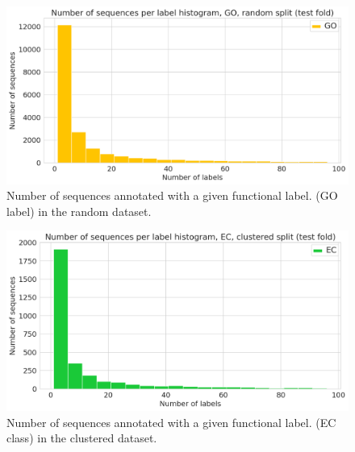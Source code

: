 \begin{figure}[htbp]
\centering
  \DIFdelbeginFL %
\DIFdelendFL \DIFaddbeginFL \includegraphics[width=\textwidth]{sequences_per_label_go_random.png}
  \DIFaddendFL \caption{Number of sequences annotated with a given functional label. (GO label) in the random dataset.}\DIFaddbeginFL {}\DIFaddendFL \end{figure}
\pagebreak
\begin{figure}[htbp]
\centering
  \DIFdelbeginFL %
\DIFdelendFL \DIFaddbeginFL \includegraphics[width=\textwidth]{sequences_per_label_ec_clustered.png}
  \DIFaddendFL \caption{Number of sequences annotated with a given functional label. (EC class) in the clustered dataset.}
\end{figure}
